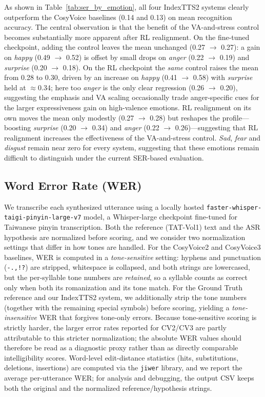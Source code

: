 As shown in Table~\ref{tab:ser_by_emotion}, all four IndexTTS2 systems clearly outperform the CosyVoice baselines (0.14 and 0.13) on mean recognition accuracy. The central observation is that the benefit of the VA-and-stress control becomes substantially more apparent after RL realignment. On the fine-tuned checkpoint, adding the control leaves the mean unchanged (0.27 $\rightarrow$ 0.27): a gain on \textit{happy} (0.49 $\rightarrow$ 0.52) is offset by small drops on \textit{anger} (0.22 $\rightarrow$ 0.19) and \textit{surprise} (0.20 $\rightarrow$ 0.18). On the RL checkpoint the \emph{same} control raises the mean from 0.28 to 0.30, driven by an increase on \textit{happy} (0.41 $\rightarrow$ 0.58) with \textit{surprise} held at $\approx$0.34; here too \textit{anger} is the only clear regression (0.26 $\rightarrow$ 0.20), suggesting the emphasis and VA scaling occasionally trade anger-specific cues for the larger expressiveness gain on high-valence emotions. RL realignment on its own moves the mean only modestly (0.27 $\rightarrow$ 0.28) but reshapes the profile---boosting \textit{surprise} (0.20 $\rightarrow$ 0.34) and \textit{anger} (0.22 $\rightarrow$ 0.26)---suggesting that RL realignment increases the effectiveness of the VA-and-stress control. \textit{Sad}, \textit{fear} and \textit{disgust} remain near zero for every system, suggesting that these emotions remain difficult to distinguish under the current SER-based evaluation.

\subsection{Word Error Rate (WER)}
\label{section:exp:wer}
We transcribe each synthesized utterance using a locally hosted \texttt{faster-whisper-}\allowbreak\texttt{taigi-pinyin-}\allowbreak\texttt{large-v7} model, a Whisper-large checkpoint fine-tuned for Taiwanese pinyin transcription. Both the reference (TAT-Vol1) text and the ASR hypothesis are normalized before scoring, and we consider two normalization settings that differ in how tones are handled. For the CosyVoice2 and CosyVoice3 baselines, WER is computed in a \emph{tone-sensitive} setting: hyphens and punctuation (\texttt{-.,!?}) are stripped, whitespace is collapsed, and both strings are lowercased, but the per-syllable tone numbers are \emph{retained}, so a syllable counts as correct only when both its romanization and its tone match. For the Ground Truth reference and our IndexTTS2 system, we additionally strip the tone numbers (together with the remaining special symbols) before scoring, yielding a \emph{tone-insensitive} WER that forgives tone-only errors. Because tone-sensitive scoring is strictly harder, the larger error rates reported for CV2/CV3 are partly attributable to this stricter normalization; the absolute WER values should therefore be read as a diagnostic proxy rather than as directly comparable intelligibility scores. Word-level edit-distance statistics (hits, substitutions, deletions, insertions) are computed via the \texttt{jiwer} library, and we report the average per-utterance WER; for analysis and debugging, the output CSV keeps both the original and the normalized reference/hypothesis strings.

